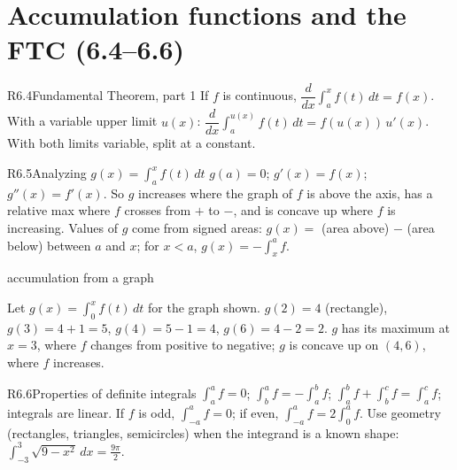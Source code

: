 \documentclass{apcalc}
\begin{document}
\section{Accumulation functions and the FTC (6.4--6.6)}

\begin{rulebox}{R6.4}{Fundamental Theorem, part 1}
If $f$ is continuous, $\dfrac{d}{dx}\displaystyle\int_a^x f(t)\,dt=f(x)$. With a variable upper limit $u(x)$: $\dfrac{d}{dx}\displaystyle\int_a^{u(x)}f(t)\,dt=f(u(x))\,u'(x)$. With both limits variable, split at a constant.
\end{rulebox}

\begin{rulebox}{R6.5}{Analyzing $g(x)=\int_a^x f(t)\,dt$}
$g(a)=0$; $g'(x)=f(x)$; $g''(x)=f'(x)$. So $g$ increases where the graph of $f$ is above the axis, has a relative max where $f$ crosses from $+$ to $-$, and is concave up where $f$ is increasing. Values of $g$ come from signed areas: $g(x)=$ (area above) $-$ (area below) between $a$ and $x$; for $x<a$, $g(x)=-\int_x^a f$.
\end{rulebox}

\begin{example}{accumulation from a graph}
\begin{center}
\end{center}
Let $g(x)=\int_0^x f(t)\,dt$ for the graph shown. $g(2)=4$ (rectangle), $g(3)=4+1=5$, $g(4)=5-1=4$, $g(6)=4-2=2$. $g$ has its maximum at $x=3$, where $f$ changes from positive to negative; $g$ is concave up on $(4,6)$, where $f$ increases. 
\end{example}

\begin{rulebox}{R6.6}{Properties of definite integrals}
$\int_a^a f=0$; $\int_b^a f=-\int_a^b f$; $\int_a^b f+\int_b^c f=\int_a^c f$; integrals are linear. If $f$ is odd, $\int_{-a}^a f=0$; if even, $\int_{-a}^a f=2\int_0^a f$. Use geometry (rectangles, triangles, semicircles) when the integrand is a known shape: $\int_{-3}^3\sqrt{9-x^2}\,dx=\frac{9\pi}{2}$.
\end{rulebox}
\end{document}
